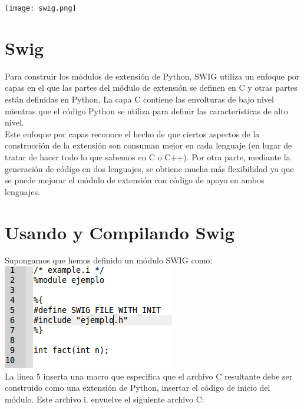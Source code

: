 \documentclass[a4paper,12pt]{article}
\author{Jorge Andrés Holguín Duque}
\begin{document}
\maketitle
\begin{center}
\texttt{[image: swig.png]}
\end{center}
\newpage
\tableofcontents
\newpage

\section{Swig}
Para construir los módulos de extensión de Python, SWIG utiliza un enfoque por capas en el que las partes del módulo de extensión se definen en C y otras partes están definidas en Python. La capa C contiene las envolturas de bajo nivel mientras que el código Python se utiliza para definir las características de alto nivel.\\

Este enfoque por capas reconoce el hecho de que ciertos aspectos de la construcción de la extensión son consuman mejor en cada lenguaje (en lugar de tratar de hacer todo lo que sabemos en C o C++). Por otra parte, mediante la generación de código en dos lenguajes, se obtiene mucha más flexibilidad ya que se puede mejorar el módulo de extensión con código de apoyo en ambos lenguajes.

\newpage

\section{Usando y Compilando Swig}
Supongamos que hemos definido un módulo SWIG como: \\

\includegraphics[scale=0.8]{Module_ejemplo.png}\\


La línea 5 inserta una macro que especifica que el archivo C resultante debe ser construido como una extensi\'on de Python, insertar el código de inicio del módulo. Este archivo i. envuelve el siguiente archivo C:
\end{document}
